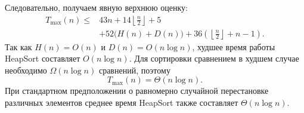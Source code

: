 \documentclass[12pt]{article}
\begin{document}
Следовательно, получаем явную верхнюю оценку:
\[
\begin{aligned}
T_{\max}(n)\leq{}&43n+14\left\lfloor\frac n2\right\rfloor+5\\
&+52\bigl(H(n)+D(n)\bigr)
+36\left(\left\lfloor\frac n2\right\rfloor+n-1\right).
\end{aligned}
\]
Так как $H(n)=O(n)$ и $D(n)=O(n\log n)$, худшее время работы HeapSort составляет $O(n\log n)$. Для сортировки сравнением в худшем случае необходимо $\Omega(n\log n)$ сравнений, поэтому
\[
    \boxed{T_{\max}(n)=\Theta(n\log n)}.
\]
При стандартном предположении о равномерно случайной перестановке различных элементов среднее время HeapSort также составляет $\Theta(n\log n)$.
\end{document}
